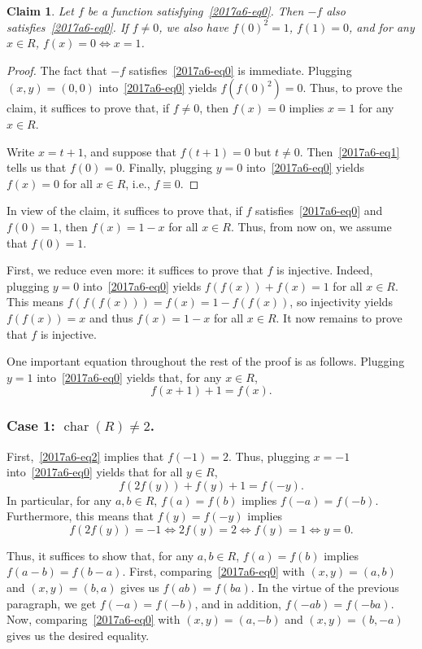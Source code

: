 \documentclass{article}
\DeclareMathOperator{\rchar}{char}
\newtheorem*{claim}{Claim}
\begin{document}
\begin{claim}
Let $f$ be a function satisfying~\eqref{2017a6-eq0}.
Then $-f$ also satisfies~\eqref{2017a6-eq0}.
If $f \neq 0$, we also have $f(0)^2 = 1$, $f(1) = 0$, and for any $x \in R$, $f(x) = 0 \iff x = 1$.
\end{claim}
\begin{proof}
The fact that $-f$ satisfies~\eqref{2017a6-eq0} is immediate.
Plugging $(x, y) = (0, 0)$ into~\eqref{2017a6-eq0} yields $f(f(0)^2) = 0$.
Thus, to prove the claim, it suffices to prove that, if $f \neq 0$, then $f(x) = 0$ implies $x = 1$ for any $x \in R$.

Write $x = t + 1$, and suppose that $f(t + 1) = 0$ but $t \neq 0$.
Then~\eqref{2017a6-eq1} tells us that $f(0) = 0$.
Finally, plugging $y = 0$ into~\eqref{2017a6-eq0} yields $f(x) = 0$ for all $x \in R$, i.e., $f \equiv 0$.
\end{proof}

In view of the claim, it suffices to prove that, if $f$ satisfies~\eqref{2017a6-eq0} and $f(0) = 1$, then $f(x) = 1 - x$ for all $x \in R$.
Thus, from now on, we assume that $f(0) = 1$.

First, we reduce even more: it suffices to prove that $f$ is injective.
Indeed, plugging $y = 0$ into~\eqref{2017a6-eq0} yields $f(f(x)) + f(x) = 1$ for all $x \in R$.
This means $f(f(f(x))) = f(x) = 1 - f(f(x))$, so injectivity yields $f(f(x)) = x$ and thus $f(x) = 1 - x$ for all $x \in R$.
It now remains to prove that $f$ is injective.

One important equation throughout the rest of the proof is as follows.
Plugging $y = 1$ into~\eqref{2017a6-eq0} yields that, for any $x \in R$,
\[ f(x + 1) + 1 = f(x). \tag{2}\label{2017a6-eq2} \]


\subsubsection*{Case 1: $\rchar(R) \neq 2$.}

First,~\eqref{2017a6-eq2} implies that $f(-1) = 2$.
Thus, plugging $x = -1$ into~\eqref{2017a6-eq0} yields that for all $y \in R$,
\[ f(2f(y)) + f(y) + 1 = f(-y). \]
In particular, for any $a, b \in R$, $f(a) = f(b)$ implies $f(-a) = f(-b)$.
Furthermore, this means that $f(y) = f(-y)$ implies
\[ f(2f(y)) = -1 \iff 2f(y) = 2 \iff f(y) = 1 \iff y = 0. \]

Thus, it suffices to show that, for any $a, b \in R$, $f(a) = f(b)$ implies $f(a - b) = f(b - a)$.
First, comparing~\eqref{2017a6-eq0} with  $(x, y) = (a, b)$ and $(x, y) = (b, a)$ gives us $f(ab) = f(ba)$.
In the virtue of the previous paragraph, we get $f(-a) = f(-b)$, and in addition, $f(-ab) = f(-ba)$.
Now, comparing~\eqref{2017a6-eq0} with $(x, y) = (a, -b)$ and $(x, y) = (b, -a)$ gives us the desired equality.
\end{document}
